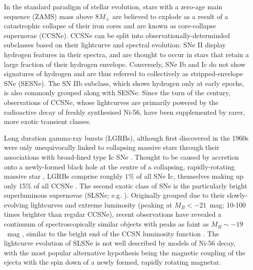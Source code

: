 \documentclass[fleqn,usenatbib,]{mnras}
\begin{document}
In the standard paradigm of stellar evolution, stars with a zero-age main sequence (ZAMS) mass above $8M_{\sun}$ are believed to explode as a result of a catastrophic collapse of their iron cores and are known as core-collapse supernovae (CCSNe). CCSNe can be split into observationally-determinded subclasses based on their lightcurve and spectral evolution: SNe II display hydrogen features in their spectra, and are thought to occur in stars that retain a large fraction of their hydrogen envelope. Conversely, SNe Ib and Ic do not show signatures of hydrogen and are thus referred to collectively as stripped-envelope SNe (SESNe). The SN IIb subclass, which shows hydrogen only at early epochs, is also commonly grouped along with SESNe. Since the turn of the century, observations of CCSNe, whose lightcurves are primarily powered by the radioactive decay of freshly synthesised Ni-56, have been supplemented by rarer, more exotic transient classes.

 Long duration gamma-ray bursts (LGRBs), although first discovered in the 1960s \citep{Klebesadel1973} were only unequivocally linked to collapsing massive stars through their associations with broad-lined type Ic SNe \citep{Galama1998,Hjorth2003}. Thought to be caused by accretion onto a newly-formed black hole at the centre of a collapsing, rapidly-rotating massive star \citep[e.g.][]{Woosley1993,Woosley2006a,Woosley2006b}, LGRBs comprise roughly $1\%$ of all SNe Ic, themselves making up only 15\% of all CCSNe \citep{Kelly2012,Graham2016}. The second exotic class of SNe is the particularly bright superluminous supernovae (SLSNe; e.g. \citealt{Quimby2011, Gal-Yam2012}). Originally grouped due to their slowly-evolving lightcurves and extreme luminosity (peaking at $M_B < -21$~mag; 10-100 times brighter than regular CCSNe), recent observations have revealed a continuum of spectroscopically similar objects with peaks as faint as $M_B \sim -19$~mag \citep{DeCia2018,Lunnan2018,Angus2019}, similar to the bright end of the CCSN luminosity function \citet{Li2011,Grayling2020}. The lightcurve evolution of SLSNe is not well described by models of Ni-56 decay, with the most popular alternative hypothesis being the magnetic coupling of the ejecta with the spin down of a newly formed, rapidly rotating magnetar.
 
\end{document}
